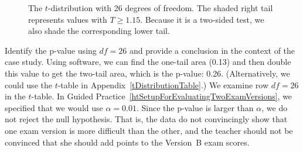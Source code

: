 \begin{figure}[h]
  \centering
  \caption{The $t$-distribution with 26 degrees of freedom.
      The shaded right tail represents values with $T \geq 1.15$.
      Because it is a two-sided test, we also shade the
      corresponding lower tail.}
  \label{pValueOfTwoTailAreaOfExamVersionsWhereDFIs26}
\end{figure}

\begin{examplewrap}
\begin{nexample}{Identify the p-value using $df = 26$
    and provide a conclusion in the context of the case study.}
  Using software, we can find the one-tail area (0.13)
  and then double this value to get the two-tail area,
  which is the p-value: 0.26.
  (Alternatively, we could use the $t$-table in
  Appendix~\ref{tDistributionTable}.)
  We examine row $df=26$ in the $t$-table.
  In Guided Practice~\ref{htSetupForEvaluatingTwoExamVersions},
  we specified that we would use $\alpha = 0.01$.
  Since the p-value is larger than $\alpha$,
  we do not reject the null hypothesis.
  That is, the data do not convincingly show that one exam
  version is more difficult than the other, and the teacher
  should not be convinced that she should add points to the
  Version~B exam scores.
\end{nexample}
\end{examplewrap}


